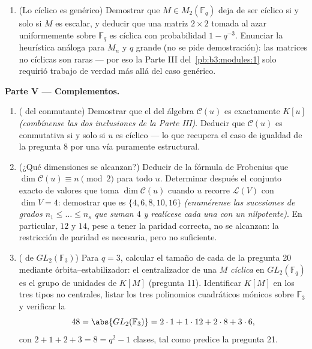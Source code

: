 \begin{problem}
\begin{enumerate}[resume]
  $q^2 - 1$ .
  \emph{(Cuéntense las cuádricas mónicas
   sobre $\mathbb F_q$;
  los pares no ordenados $\{a, b\}$; recuérdese que la invertibilidad
  restringe los términos independientes.)} \item (Lo cíclico es
  genérico) Demostrar que $M \in M_2(\mathbb F_q)$ deja de ser cíclico
  si y solo si $M$ es escalar, y deducir que una matriz $2\times2$
  tomada al azar uniformemente sobre $\mathbb F_q$ es cíclica con
  probabilidad $1 - q^{-3}$. Enunciar la heurística análoga para $M_n$ y
  $q$ grande (no se pide demostración): las matrices no cíclicas son
  raras --- por eso la Parte III del~\cref{pb:b3:modules:1} solo
  requirió trabajo de verdad más allá del caso genérico.
\end{enumerate}

\medskip
\noindent\textbf{Parte V --- Complementos.}
\begin{enumerate}[resume]
  \item ( del conmutante) Demostrar
  que el  del álgebra
  $\mathcal C(u)$ es exactamente $K[u]$ \emph{(combínense las dos
  inclusiones de la Parte III)}. Deducir que $\mathcal C(u)$ es
  conmutativa si y solo si $u$ es cíclico --- lo que recupera el caso de
  igualdad de la pregunta 8 por una vía puramente estructural. \item
  (¿Qué dimensiones se alcanzan?) Deducir de la fórmula de Frobenius que
  $\dim\mathcal C(u) \equiv n \pmod 2$ para todo $u$. Determinar después
  el conjunto exacto de valores que toma $\dim \mathcal C(u)$ cuando $u$
  recorre $\mathcal L(V)$ con $\dim V = 4$: demostrar que es $\{4, 6,
        8, 10, 16\}$ \emph{(enumérense las sucesiones de grados $n_1
        \leq \dots \leq n_s$ que suman $4$ y realícese cada una con un
  nilpotente)}. En particular, $12$ y $14$, pese a tener la paridad
  correcta, no se alcanzan: la restricción de paridad es necesaria, pero
  no suficiente. \item ( de $GL_2(\mathbb F_3)$) Para $q = 3$, calcular el tamaño de
  cada  de la
  pregunta 20 mediante órbita--estabilizador: el centralizador de una
  $M$ \emph{cíclica} en $GL_2(\mathbb F_q)$ es el grupo de unidades de
  $K[M]$ (pregunta 11). Identificar $K[M]$ en los tres tipos no
  centrales, listar los tres polinomios cuadráticos mónicos
   sobre $\mathbb F_3$ y
  verificar la 
        \[
        48 = \abs{GL_2(\mathbb F_3)}
        = 2\cdot1 + 1\cdot12 + 2\cdot8 + 3\cdot6,
        \]
        con $2 + 1 + 2 + 3 = 8 = q^2 - 1$ clases, tal como predice la
        pregunta 21.
\end{enumerate}
\end{problem}
